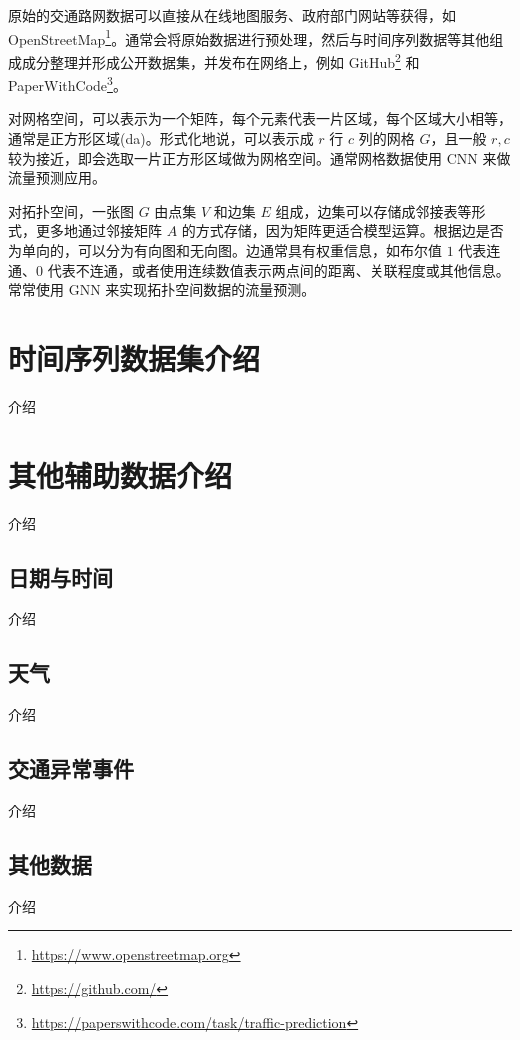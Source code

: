 \documentclass{ctexart}
\begin{document}
原始的交通路网数据可以直接从在线地图服务、政府部门网站等获得，如 OpenStreetMap\footnote{\url{https://www.openstreetmap.org}}。通常会将原始数据进行预处理，然后与时间序列数据等其他组成成分整理并形成公开数据集，并发布在网络上，例如 GitHub\footnote{\url{https://github.com/}} 和 PaperWithCode\footnote{\url{https://paperswithcode.com/task/traffic-prediction}}。

对网格空间，可以表示为一个矩阵，每个元素代表一片区域，每个区域大小相等，通常是正方形区域(da)。形式化地说，可以表示成 $r$ 行 $c$ 列的网格 $G$，且一般 $r,c$ 较为接近，即会选取一片正方形区域做为网格空间。通常网格数据使用 CNN 来做流量预测应用。

对拓扑空间，一张图 $G$ 由点集 $V$ 和边集 $E$ 组成，边集可以存储成邻接表等形式，更多地通过邻接矩阵 $A$ 的方式存储，因为矩阵更适合模型运算。根据边是否为单向的，可以分为有向图和无向图。边通常具有权重信息，如布尔值 $1$ 代表连通、$0$ 代表不连通，或者使用连续数值表示两点间的距离、关联程度或其他信息。常常使用 GNN 来实现拓扑空间数据的流量预测。%

\section{时间序列数据集介绍}
介绍

\section{其他辅助数据介绍}
介绍

\subsection{日期与时间}
介绍

\subsection{天气}
介绍

\subsection{交通异常事件}
介绍

\subsection{其他数据}
介绍



\end{document}
